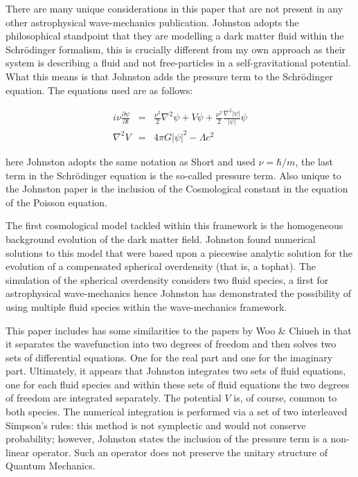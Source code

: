 There are many unique considerations in this paper that are not present in any other astrophysical wave-mechanics publication. Johnston adopts the philosophical standpoint that they are modelling a dark matter fluid within the Schr\"odinger formalism, this is crucially different from my own approach as their system is describing a fluid and not free-particles in a self-gravitational potential. What this means is that Johnston adds the pressure term to the Schr\"odinger equation. The equations used are as follows:

\begin{eqnarray}
i\nu \frac{\partial\psi}{\partial t} &=& \frac{\nu^2}{2} \nabla^2\psi + V\psi + \frac{\nu^2}{2} \frac{\nabla^2 |\psi|}{|\psi|}\psi  \\
\nabla^2 V &=& 4\pi G|\psi|^2  - \Lambda c^2
\end{eqnarray}

\noindent here Johnston adopts the same notation as Short and used $\nu=\hbar/m$, the last term in the Schr\"odinger equation is the so-called pressure term. Also unique to the Johnston paper is the inclusion of the Cosmological constant in the equation of the Poisson equation.

The first cosmological model tackled within this framework is the homogeneous background evolution of the dark matter field. Johnston found numerical solutions to this model that were based upon a piecewise analytic solution for the evolution of a compensated spherical overdensity (that is, a tophat). The simulation of the spherical overdensity considers two fluid species, a first for astrophysical wave-mechanics hence Johnston has demonstrated the possibility of using multiple fluid species within the wave-mechanics framework.

This paper includes has some similarities to the papers by Woo \& Chiueh in that it separates the wavefunction into two degrees of freedom and then solves two sets of differential equations. One for the real part and one for the imaginary part. Ultimately, it appears that Johnston integrates two sets of fluid equations, one for each fluid species and within these sets of fluid equations the two degrees of freedom are integrated separately. The potential $V$ is, of course, common to both species. The numerical integration is performed via a set of two interleaved Simpson's rules: this method is not symplectic and would not conserve probability; however, Johnston states the inclusion of the pressure term is a non-linear operator. Such an operator does not preserve the unitary structure of Quantum Mechanics.

